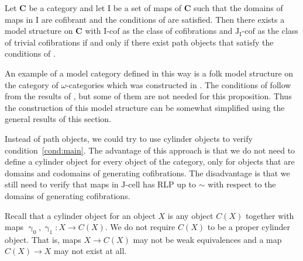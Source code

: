 \documentclass{tac}
\theoremstyle{definition}
\newcommand{\cat}[1]{\mathbf{#1}}
\newcommand{\C}{\cat{C}}
\newcommand{\I}{\mathrm{I}}
\newcommand{\J}{\mathrm{J}}
\newcommand{\class}[2]{#1\text{-}\mathrm{#2}}
\newcommand{\Icell}[1][\I]{\class{#1}{cell}}
\newcommand{\Icof}[1][\I]{\class{#1}{cof}}
\newcommand{\Jcell}[1][]{\Icell[\J#1]}
\newcommand{\Jcof}[1][]{\Icof[\J#1]}
\newcommand{\cyli}{\upgamma}
\begin{document}
\begin{cor}
Let $\C$ be a category and let $\I$ be a set of maps of $\C$ such that the domains of maps in $\I$ are cofibrant and the conditions of  are satisfied.
Then there exists a model structure on $\C$ with $\Icof$ as the class of cofibrations and $\Jcof[_\I]$ as the class of trivial cofibrations
if and only if there exist path objects that satisfy the conditions of .
\end{cor}

\begin{exmp}
An example of a model category defined in this way is a folk model structure on the category of $\omega$-categories which was constructed in \cite{folk}.
The conditions of  follow from the results of \cite{folk}, but some of them are not needed for this proposition.
Thus the construction of this model structure can be somewhat simplified using the general results of this section.
\end{exmp}

Instead of path objects, we could try to use cylinder objects to verify condition~\eqref{cond:main}.
The advantage of this approach is that we do not need to define a cylinder object for every object of the category,
only for objects that are domains and codomains of generating cofibrations.
The disadvantage is that we still need to verify that maps in $\Jcell$ has RLP up to $\sim$ with respect to the domains of generating cofibrations.

Recall that a cylinder object for an object $X$ is any object $C(X)$ together with maps $\cyli_0,\cyli_1 : X \to C(X)$.
We do not require $C(X)$ to be a proper cylinder object.
That is, maps $X \to C(X)$ may not be weak equivalences and a map $C(X) \to X$ may not exist at all.
\end{document}
